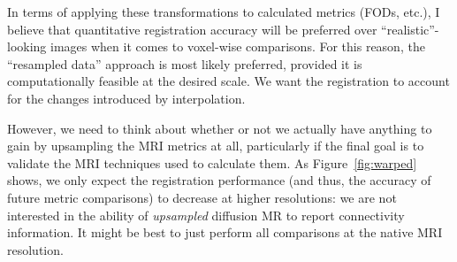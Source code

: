 \documentclass[11pt]{article}
\begin{document}
In terms of applying these transformations to calculated metrics (FODs, etc.), I
believe that quantitative registration accuracy will be preferred over
``realistic''-looking images when it comes to voxel-wise comparisons. For this
reason, the ``resampled data'' approach is most likely preferred, provided it is
computationally feasible at the desired scale. We want the registration to
account for the changes introduced by interpolation.

However, we need to think about whether or not we actually have anything to gain
by upsampling the MRI metrics at all, particularly if the final goal is to
validate the MRI techniques used to calculate them. As Figure~\ref{fig:warped}
shows, we only expect the registration performance (and thus, the accuracy of
future metric comparisons) to decrease at higher resolutions: we are not
interested in the ability of \textit{upsampled} diffusion MR to report
connectivity information. It might be best to just perform all
comparisons at the native MRI resolution. 
\end{document}
